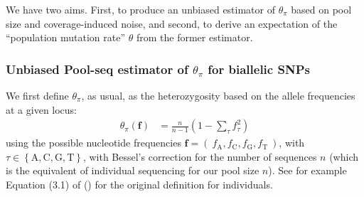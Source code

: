 \documentclass[a4paper,9pt,DIV=14]{scrartcl}
\newcommand\citeay[1]{\citeauthor{#1} (\citeyear{#1}) \cite{#1}}
\begin{document}
We have two aims. First, to produce an unbiased estimator of $\theta_{\pi}$ based on pool size and coverage-induced noise, and second, to derive an expectation of the ``population mutation rate'' $\theta$ from the former estimator.



\subsubsection*{Unbiased Pool-seq estimator of \texorpdfstring{$\theta_{\pi}$}{Theta Pi} for biallelic SNPs}
\label{supp:sec:ThetaPi:sub:PoolSequencing}

%

We first define $\theta_\pi$, as usual, as the heterozygosity based on the allele frequencies at a given locus:
%
\begin{align}
    \label{eq:ThetaPiFreqF}
    \theta_\pi(\bm{f}) &= \frac{n}{n-1} \left(1 - \sum_\tau f_\tau^2 \right)
\end{align}
%
using the possible nucleotide frequencies $\bm{f} = (~ f_\text{A}, f_\text{C}, f_\text{G}, f_\text{T} ~)$, with $\tau \in \left\{ \text{A}, \text{C}, \text{G}, \text{T} \right\}$, with Bessel's correction for the number of sequences $n$ (which is the equivalent of individual sequencing for our pool size $n$).
See for example Equation (3.1) of \citeay{Hahn2018} for the original definition for individuals.
\end{document}
